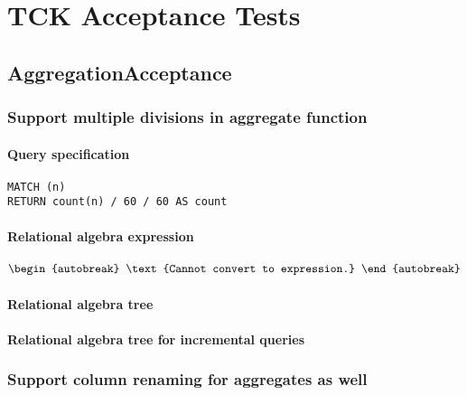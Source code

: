 \chapter{TCK Acceptance Tests}
\label{chp:tck}

\section{AggregationAcceptance}


\subsection{Support multiple divisions in aggregate function}

\subsubsection*{Query specification}

\begin{lstlisting}
MATCH (n)
RETURN count(n) / 60 / 60 AS count
\end{lstlisting}

\subsubsection*{Relational algebra expression}

\begin{align*}
\begin{autobreak}
\text{Cannot convert to expression.}
\end{autobreak}
\end{align*}

\subsubsection*{Relational algebra tree}


\subsubsection*{Relational algebra tree for incremental queries}


\subsection{Support column renaming for aggregates as well}

